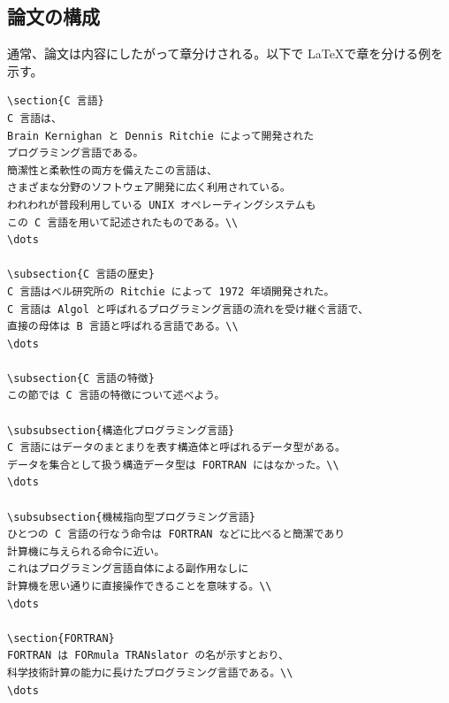 \subsection{論文の構成}
\label{sec:latex:section}

通常、論文は内容にしたがって章分けされる。以下で \LaTeX で章を分ける例を示す。
\begin{reidai}
\begin{verbatim}
\section{C 言語}
C 言語は、
Brain Kernighan と Dennis Ritchie によって開発された
プログラミング言語である。
簡潔性と柔軟性の両方を備えたこの言語は、
さまざまな分野のソフトウェア開発に広く利用されている。
われわれが普段利用している UNIX オペレーティングシステムも
この C 言語を用いて記述されたものである。\\
\dots

\subsection{C 言語の歴史}
C 言語はベル研究所の Ritchie によって 1972 年頃開発された。
C 言語は Algol と呼ばれるプログラミング言語の流れを受け継ぐ言語で、
直接の母体は B 言語と呼ばれる言語である。\\
\dots

\subsection{C 言語の特徴}
この節では C 言語の特徴について述べよう。

\subsubsection{構造化プログラミング言語}
C 言語にはデータのまとまりを表す構造体と呼ばれるデータ型がある。
データを集合として扱う構造データ型は FORTRAN にはなかった。\\
\dots

\subsubsection{機械指向型プログラミング言語}
ひとつの C 言語の行なう命令は FORTRAN などに比べると簡潔であり
計算機に与えられる命令に近い。
これはプログラミング言語自体による副作用なしに
計算機を思い通りに直接操作できることを意味する。\\
\dots

\section{FORTRAN}
FORTRAN は FORmula TRANslator の名が示すとおり、
科学技術計算の能力に長けたプログラミング言語である。\\
\dots
\end{verbatim}
\end{reidai} \noindent
